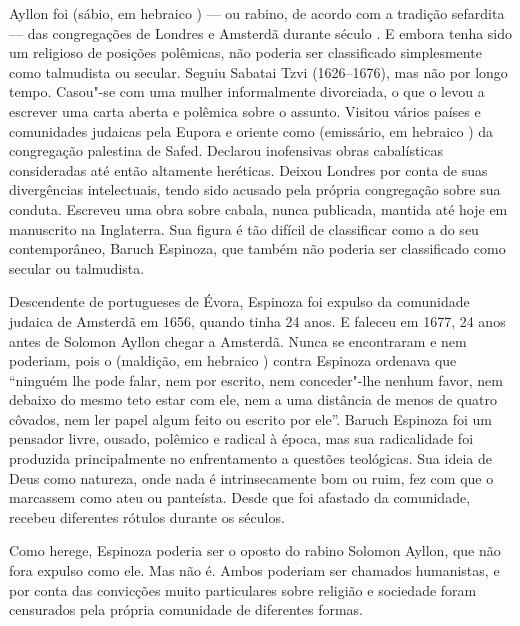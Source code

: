 \begin{multicols}{2}
Ayllon foi {} (sábio, em hebraico {}) --- ou rabino, de acordo com a tradição sefardita --- das congregações de Londres e Amsterdã durante século . E embora tenha sido um religioso de posições polêmicas, não poderia ser classificado simplesmente como talmudista ou secular. Seguiu Sabatai Tzvi (1626--1676), mas não por longo tempo. Casou"-se com uma mulher informalmente divorciada, o que o levou a escrever uma carta aberta e polêmica sobre o assunto. Visitou vários países e comunidades judaicas pela Eupora e oriente como {} (emissário, em hebraico {}) da congregação palestina de Safed. Declarou inofensivas obras cabalísticas consideradas até então altamente heréticas. Deixou Londres por conta de suas divergências intelectuais, tendo sido acusado pela própria congregação sobre sua conduta. Escreveu uma obra sobre cabala, nunca publicada, mantida até hoje em manuscrito na Inglaterra. Sua figura é tão difícil de classificar como a do seu contemporâneo, Baruch Espinoza, que também não poderia ser classificado como secular ou talmudista.

\bigskip

{\small{}}

\bigskip

Descendente de portugueses de Évora, Espinoza foi expulso da comunidade judaica de Amsterdã em 1656, quando tinha 24 anos. E faleceu em 1677, 24 anos antes de Solomon Ayllon chegar a Amsterdã. Nunca se encontraram e nem poderiam, pois o {} (maldição, em hebraico {}) contra Espinoza ordenava que ``ninguém lhe pode falar, nem por escrito, nem conceder"-lhe nenhum favor, nem debaixo do mesmo teto estar com ele, nem a uma distância de menos de quatro côvados, nem ler papel algum feito ou escrito por ele''. Baruch Espinoza foi um pensador livre, ousado, polêmico e radical à época, mas sua radicalidade foi produzida principalmente no enfrentamento a questões teológicas. Sua ideia de Deus como natureza, onde nada é intrinsecamente bom ou ruim, fez com que o marcassem como ateu ou panteísta. Desde que foi afastado da comunidade, recebeu diferentes rótulos durante os séculos.

Como herege, Espinoza poderia ser o oposto do rabino Solomon Ayllon, que não fora expulso como ele. Mas não é. Ambos poderiam ser chamados humanistas, e por conta das convicções muito particulares sobre religião e sociedade foram censurados pela própria comunidade de diferentes formas.


\end{multicols}
